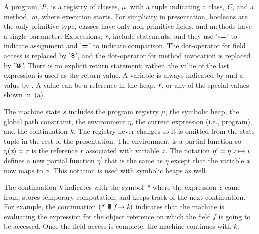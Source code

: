 A program, $\emph{P}$, is a registry of classes, $\mu$, with
a tuple indicating a class, $\emph{C}$, and a method, $\emph{m}$,
where execution starts. For simplicity in presentation, booleans are the only primitive type, 
classes have only non-primitive fields, and methods have a single
parameter. Expressions, $\emph{e}$, include statements, and they use
'$\textbf{:=}$' to indicate assignment and '$\textbf{=}$' to indicate
comparison.  The dot-operator for field access is replaced by
'$\textbf{\$}$', and the dot-operator for method invocation is replaced
by '$\textbf{@}$'. There is no
explicit return statement; rather, the value of the last expression is
used as the return value. A variable is always indicated by 
and a value by . A value can be a reference in the heap,
$\emph{r}$, or any of the special values shown
in~(a).  


The machine state $\emph{s}$ includes the program
registry $\mu$, the symbolic heap, the global path constraint, the environment $\eta$, the current expression (i.e., program), and the continuation $\emph{k}$. The registry never changes so it is
omitted from the state tuple in the rest of the presentation. The environment is a partial function so $\eta(\emph{x}) = \emph{r}$ is the reference
$\emph{r}$ associated with variable $\emph{x}$. The notation
$\eta^\prime = \eta[\emph{x} \mapsto \emph{v}]$ defines a new
partial function $\eta^\prime$ that is the same as $\eta$ except that
the variable $\emph{x}$ now maps to $\emph{v}$. This notation is used with symbolic heaps as well. 

The continuation
$\emph{k}$ indicates with the symbol $\emph{*}$ where the expression $\emph{e}$ came from, stores
temporary computation, and keeps track of the next continuation. For
example, the continuation $(\textbf{*}\ \textbf{\$}\ \emph{f}
\rightarrow \emph{k})$ indicates that the machine is evaluating the
expression for the object reference on which the field $\emph{f}$ is
going to be accessed. Once the field access is complete, the machine
continues with $\emph{k}$.  


